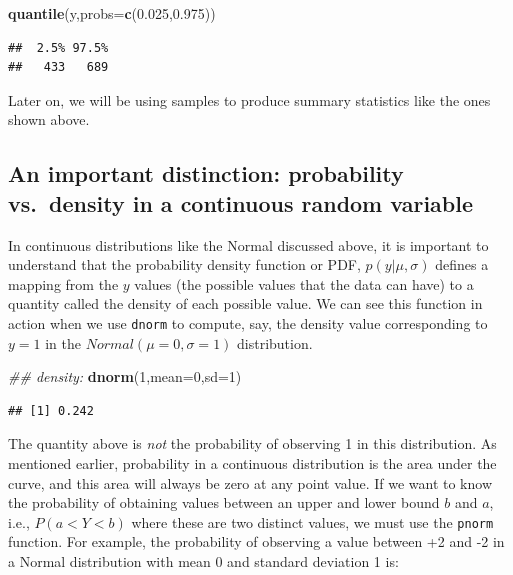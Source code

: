 \documentclass[12pt,]{krantz}
\newenvironment{Shaded}{\begin{snugshade}}{\end{snugshade}}
\newcommand{\CommentTok}[1]{\textcolor[rgb]{0.56,0.35,0.01}{\textit{#1}}}
\newcommand{\DataTypeTok}[1]{\textcolor[rgb]{0.13,0.29,0.53}{#1}}
\newcommand{\DecValTok}[1]{\textcolor[rgb]{0.00,0.00,0.81}{#1}}
\newcommand{\FloatTok}[1]{\textcolor[rgb]{0.00,0.00,0.81}{#1}}
\newcommand{\KeywordTok}[1]{\textcolor[rgb]{0.13,0.29,0.53}{\textbf{#1}}}
\newcommand{\NormalTok}[1]{#1}
\theoremstyle{definition}
\theoremstyle{definition}
\theoremstyle{definition}
\theoremstyle{remark}
\begin{document}
\begin{Shaded}
\begin{Highlighting}[]
\KeywordTok{quantile}\NormalTok{(y,}\DataTypeTok{probs=}\KeywordTok{c}\NormalTok{(}\FloatTok{0.025}\NormalTok{,}\FloatTok{0.975}\NormalTok{))}
\end{Highlighting}
\end{Shaded}

\begin{verbatim}
##  2.5% 97.5% 
##   433   689
\end{verbatim}

Later on, we will be using samples to produce summary statistics like the ones shown above.

\hypertarget{an-important-distinction-probability-vs.density-in-a-continuous-random-variable}{%
\subsection{An important distinction: probability vs.~density in a continuous random variable}\label{an-important-distinction-probability-vs.density-in-a-continuous-random-variable}}

In continuous distributions like the Normal discussed above, it is important to understand that the probability density function or PDF, \(p(y| \mu, \sigma)\) defines a mapping from the \(y\) values (the possible values that the data can have) to a quantity called the density of each possible value. We can see this function in action when we use \texttt{dnorm} to compute, say, the density value corresponding to \(y=1\) in the \(Normal(\mu=0,\sigma=1)\) distribution.

\begin{Shaded}
\begin{Highlighting}[]
\CommentTok{## density:}
\KeywordTok{dnorm}\NormalTok{(}\DecValTok{1}\NormalTok{,}\DataTypeTok{mean=}\DecValTok{0}\NormalTok{,}\DataTypeTok{sd=}\DecValTok{1}\NormalTok{)}
\end{Highlighting}
\end{Shaded}

\begin{verbatim}
## [1] 0.242
\end{verbatim}

The quantity above is \emph{not} the probability of observing 1 in this distribution. As mentioned earlier, probability in a continuous distribution is the area under the curve, and this area will always be zero at any point value. If we want to know the probability of obtaining values between an upper and lower bound \(b\) and \(a\), i.e., \(P(a<Y<b)\) where these are two distinct values, we must use the \texttt{pnorm} function. For example, the probability of observing a value between +2 and -2 in a Normal distribution with mean 0 and standard deviation 1 is:
\end{document}
